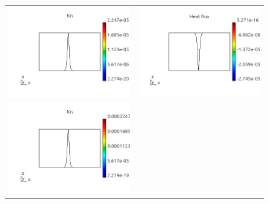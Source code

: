 \documentclass[review]{elsarticle}
\begin{document}
\begin{figure}[tbh]
  \begin{center}
    \begin{tabular}{cc}
      \includegraphics[width=\psize\textwidth]{figs/Kn_p41D1e6.png} &
      \includegraphics[width=\psize\textwidth]{figs/hflux_p41D1e6.png} \\
      \includegraphics[width=\psize\textwidth]{figs/Kn_p41D1e5.png} &

\end{tabular}
\end{center}
\end{figure}
\end{document}
